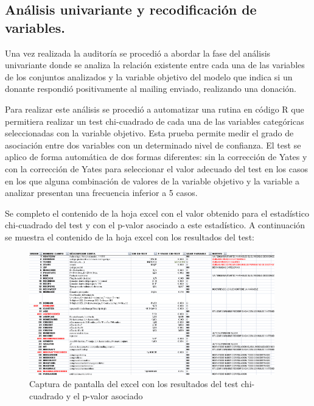 \subsection{Análisis univariante y recodificación de variables.}

Una vez realizada la auditoría se procedió a abordar la fase del análisis univariante donde se analiza la relación existente entre cada una de las variables de los conjuntos analizados y la variable objetivo del modelo que indica si un donante respondió positivamente al mailing enviado, realizando una donación.

Para realizar este análisis se procedió a automatizar una rutina en código R que permitiera realizar un test chi-cuadrado de cada una de las variables categóricas seleccionadas con la variable objetivo. Esta prueba permite medir el grado de asociación entre dos variables con un determinado nivel de confianza. El test se aplico de forma automática de dos formas diferentes: sin la corrección de Yates y con la corrección de Yates para seleccionar el valor adecuado del test en los casos en los que alguna combinación de valores de la variable objetivo y la variable a analizar presentan una frecuencia inferior a 5 casos.

Se completo el contenido de la hoja excel con el valor obtenido para el estadístico chi-cuadrado del test y con el p-valor asociado a este estadístico. A continuación se muestra el contenido de la hoja excel con los resultados del test:

\begin{figure}[H]
\begin{center}
\includegraphics[width=0.95\textwidth]{img/univariante1}
\caption{Captura de pantalla del excel con los resultados del test chi-cuadrado y el p-valor asociado}
\end{center}
\end{figure}

